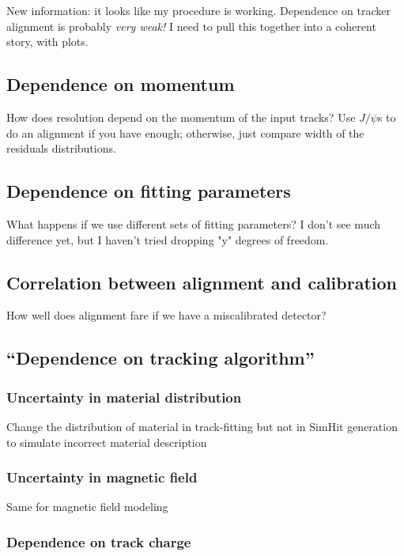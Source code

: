 \documentclass[12pt]{article}
\begin{document}
New information: it looks like my procedure is working.  Dependence on
tracker alignment is probably {\it very weak!}  I need to pull this
together into a coherent story, with plots.

\subsection{Dependence on momentum}

How does resolution depend on the momentum of the input tracks?
Use $J/\psi$s to do an alignment if you have enough; otherwise, just
compare width of the residuals distributions.

\subsection{Dependence on fitting parameters}

What happens if we use different sets of fitting parameters?  I
don't see much difference yet, but I haven't tried dropping "y"
degrees of freedom.

\subsection{Correlation between alignment and calibration}

How well does alignment fare if we have a miscalibrated detector?

\subsection{``Dependence on tracking algorithm''}

\subsubsection{Uncertainty in material distribution}
Change the distribution of material in track-fitting but not
in SimHit generation to simulate incorrect material
description

\subsubsection{Uncertainty in magnetic field}

Same for magnetic field modeling

\subsubsection{Dependence on track charge}
\end{document}
